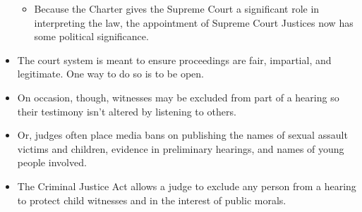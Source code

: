 \documentclass{article}
\begin{document}
\begin{itemize}
\begin{itemize}
            \item Because the Charter gives the Supreme Court a significant role in interpreting the law, the appointment of Supreme Court Justices now has some political significance.
        \end{itemize}
    \item The court system is meant to ensure proceedings are fair, impartial, and legitimate.  One way to do so is to be open.
    \item On occasion, though, witnesses may be excluded from part of a hearing so their testimony isn't altered by listening to others.
    \item Or, judges often place media bans on publishing the names of sexual assault victims and children, evidence in preliminary hearings, and names of young people involved.
    \item The Criminal Justice Act allows a judge to exclude any person from a hearing to protect child witnesses and in the interest of public morals.
\end{itemize}
\end{document}

